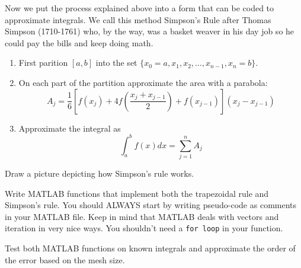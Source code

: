\begin{problem}
    Now we put the process explained above into a form that can be coded to approximate
    integrals. We call this method Simpson's Rule after Thomas Simpson (1710-1761) who, by
    the way, was a basket weaver in his day job so he could pay the bills and keep doing
    math.
    \begin{enumerate}
        \item First parition $[a,b]$ into the set $\{x_0=a, x_1, x_2, \ldots, x_{n-1},
        x_n=b\}$.
        \item On each part of the partition approximate the area with a parabola:
            \[ A_j = \frac{1}{6} \left[ f(x_j) + 4 f\left( \frac{x_j+x_{j-1}}{2} \right) +
                f(x_{j-1}) \right]\left( x_j - x_{j-1} \right) \]
        \item Approximate the integral as
            \[ \int_a^b f(x) dx = \sum_{j=1}^n A_j \]
    \end{enumerate}
    Draw a picture depicting how Simpson's rule works.
\end{problem}

\begin{problem}
    Write MATLAB functions that implement both the trapezoidal rule and Simpson's rule.
    You should ALWAYS start by writing pseudo-code as comments in your MATLAB file.   Keep
    in mind that MATLAB deals with vectors and iteration in very nice ways.  You shouldn't
    need a \texttt{for loop} in your function.

    Test both MATLAB functions on known integrals and approximate the order of the error
    based on the mesh size.  
\end{problem}


